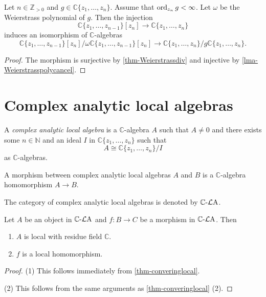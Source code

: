 \begin{corollary}
    Let $n\in \mathbb{Z}_{>0}$ and $g\in \mathbb{C}\{ z_1,\ldots,z_{n}\}$. Assume that $\operatorname{ord}_{z_n}g<\infty$. Let $\omega$ be the Weierstrass polynomial of $g$. Then the injection
    \[
        \mathbb{C}\{ z_1,\ldots,z_{n-1}\}[z_n]\rightarrow \mathbb{C}\{ z_1,\ldots,z_{n}\}
    \]
    induces an isomorphism of $\mathbb{C}$-algebras
    \[
        \mathbb{C}\{ z_1,\ldots,z_{n-1}\}[z_n]/\omega\mathbb{C}\{ z_1,\ldots,z_{n-1}\}[z_n]\rightarrow \mathbb{C}\{ z_1,\ldots,z_{n}\}/g\mathbb{C}\{ z_1,\ldots,z_{n}\}.
    \]
\end{corollary}
\begin{proof}
    The morphism is surjective by \cref{thm-Weierstrassdiv} and injective by \cref{lma-Weierstrasspolycancel}.
\end{proof}



\section{Complex analytic local algebras}

\begin{definition}\label{def-complexanalylocaalg}
    A \emph{complex analytic local algebra} is a $\mathbb{C}$-algebra $A$ such that $A\neq 0$ and there exists some $n\in \mathbb{N}$ and an ideal $I$ in $\mathbb{C}\{ z_1,\ldots,z_n \}$ such that 
    \[
        A\cong \mathbb{C}\{ z_1,\ldots,z_n \}/I
    \]
    as $\mathbb{C}$-algebras.

    A morphism between complex analytic local algebras $A$ and $B$ is a $\mathbb{C}$-algebra homomorphism $A\rightarrow B$.

    The category of complex analytic local algebras is denoted by $\mathbb{C}\text{-}\mathcal{L}\mathrm{A}$.
\end{definition}

\begin{proposition}\label{prop-converinglocalgeneral}
    Let $A$ be an object in $\mathbb{C}\text{-}\mathcal{L}\mathrm{A}$ and $f:B\rightarrow C$ be a morphism in  $\mathbb{C}\text{-}\mathcal{L}\mathrm{A}$. Then
    \begin{enumerate}
        \item $A$ is local with residue field $\mathbb{C}$.
        \item $f$ is a local homomorphism.
    \end{enumerate}
\end{proposition}
\begin{proof}
    (1) This follows immediately from \cref{thm-converinglocal}.
    
    (2) This follows from the same arguments as \cref{thm-converinglocal} (2).
\end{proof}




